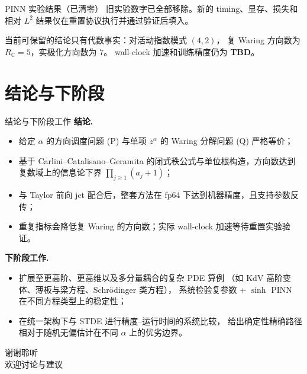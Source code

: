 \documentclass[10pt,aspectratio=169]{beamer}
\newcommand{\C}{\mathbb{C}}
\begin{document}
\begin{frame}{PINN 实验结果（已清零）}
  旧实验数字已全部移除。新的 timing、显存、损失和相对 $L^2$
  结果仅在重置协议执行并通过验证后填入。

  \medskip
  当前可保留的结论只有代数事实：对活动指数模式 $(4,2)$，
  复 Waring 方向数为 $R_\C=5$，实极化方向数为 $7$。
  wall-clock 加速和训练精度仍为 \textbf{TBD}。
\end{frame}

\section{结论与下阶段}

\begin{frame}{结论与下阶段工作}
  \textbf{结论.}
  \begin{itemize}
    \item 给定 $\alpha$ 的方向调度问题 (P) 与单项 $z^\alpha$ 的 Waring 分解问题 (Q) 严格等价；
    \item 基于 Carlini--Catalisano--Geramita 的闭式秩公式与单位根构造，方向数达到复数域上的信息论下界 $\prod_{j\ge1}(a_j+1)$；
    \item 与 Taylor 前向 jet 配合后，整套方法在 fp64 下达到机器精度，且支持参数反传；
    \item 重复指标会降低复 Waring 的方向数；实际 wall-clock 加速等待重置实验验证。
  \end{itemize}

  \medskip
  \textbf{下阶段工作.}
  \begin{itemize}
    \item 扩展至更高阶、更高维以及多分量耦合的复杂 PDE 算例
        （如 KdV 高阶变体、薄板与梁方程、Schrödinger 类方程），
        系统检验复参数 + $\sinh$ PINN 在不同方程类型上的稳定性；
    \item 在统一架构下与 STDE 进行精度--运行时间的系统比较，
        给出确定性精确路径相对于随机无偏估计在不同 $\alpha$ 上的优劣边界。
  \end{itemize}
\end{frame}

\begin{frame}
  \begin{center}
    \vspace{1.5em}
    {\Large 谢谢聆听}\\[1em]
    \large 欢迎讨论与建议
  \end{center}
\end{frame}
\end{document}
